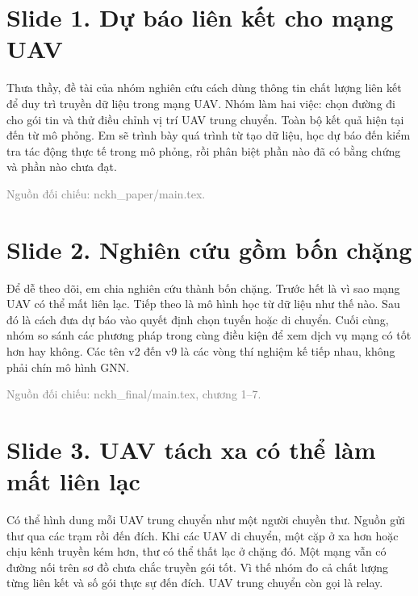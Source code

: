 
\section*{Slide 1. Dự báo liên kết cho mạng UAV}


Thưa thầy, đề tài của nhóm nghiên cứu cách dùng thông tin chất lượng liên kết để duy trì truyền dữ liệu trong mạng UAV. Nhóm làm hai việc: chọn đường đi cho gói tin và thử điều chỉnh vị trí UAV trung chuyển. Toàn bộ kết quả hiện tại đến từ mô phỏng. Em sẽ trình bày quá trình từ tạo dữ liệu, học dự báo đến kiểm tra tác động thực tế trong mô phỏng, rồi phân biệt phần nào đã có bằng chứng và phần nào chưa đạt.

{\small\textcolor{gray}{Nguồn đối chiếu: nckh\_paper/main.tex.}}




\section*{Slide 2. Nghiên cứu gồm bốn chặng}


Để dễ theo dõi, em chia nghiên cứu thành bốn chặng. Trước hết là vì sao mạng UAV có thể mất liên lạc. Tiếp theo là mô hình học từ dữ liệu như thế nào. Sau đó là cách đưa dự báo vào quyết định chọn tuyến hoặc di chuyển. Cuối cùng, nhóm so sánh các phương pháp trong cùng điều kiện để xem dịch vụ mạng có tốt hơn hay không. Các tên v2 đến v9 là các vòng thí nghiệm kế tiếp nhau, không phải chín mô hình GNN.

{\small\textcolor{gray}{Nguồn đối chiếu: nckh\_final/main.tex, chương 1–7.}}




\section*{Slide 3. UAV tách xa có thể làm mất liên lạc}


Có thể hình dung mỗi UAV trung chuyển như một người chuyền thư. Nguồn gửi thư qua các trạm rồi đến đích. Khi các UAV di chuyển, một cặp ở xa hơn hoặc chịu kênh truyền kém hơn, thư có thể thất lạc ở chặng đó. Một mạng vẫn có đường nối trên sơ đồ chưa chắc truyền gói tốt. Vì thế nhóm đo cả chất lượng từng liên kết và số gói thực sự đến đích. UAV trung chuyển còn gọi là relay.

